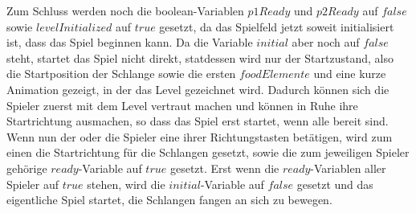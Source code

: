 Zum Schluss werden noch die boolean-Variablen $p1Ready$ und $p2Ready$ auf $false$ sowie $levelInitialized$ auf $true$ gesetzt, da das Spielfeld jetzt soweit initialisiert ist, dass das Spiel beginnen kann. Da die Variable $initial$ aber noch auf $false$ steht, startet das Spiel nicht direkt, statdessen wird nur der Startzustand, also die Startposition der Schlange sowie die ersten $foodElemente$ und eine kurze Animation gezeigt, in der das Level gezeichnet wird. Dadurch können sich die Spieler zuerst mit dem Level vertraut machen und können in Ruhe ihre Startrichtung ausmachen, so dass das Spiel erst startet, wenn alle bereit sind. Wenn nun der oder die Spieler eine ihrer Richtungstasten betätigen, wird zum einen die Startrichtung für die Schlangen gesetzt, sowie die zum jeweiligen Spieler gehörige $ready$-Variable auf $true$ gesetzt. Erst wenn die $ready$-Variablen aller Spieler auf $true$ stehen, wird die $initial$-Variable auf $false$ gesetzt und das eigentliche Spiel startet, die Schlangen fangen an sich zu bewegen.
%

